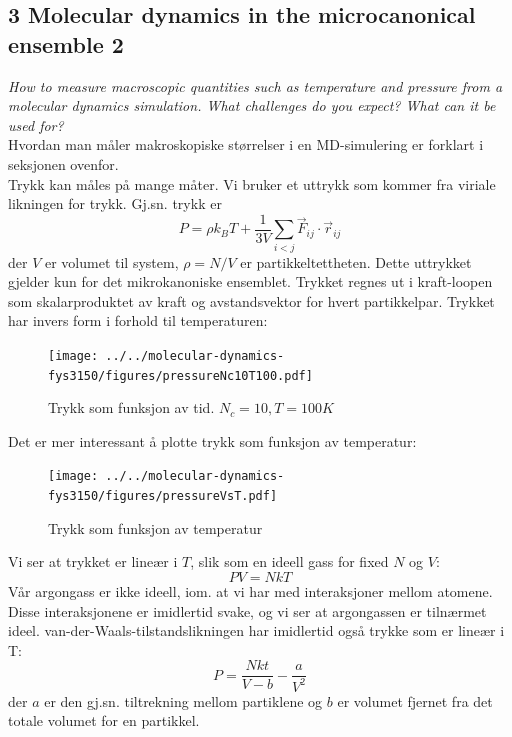 \documentclass[english, a4paper]{article}
\begin{document}
\subsection{3 Molecular dynamics in the microcanonical ensemble 2}
\textit{How to measure macroscopic quantities such as temperature and pressure from a 
molecular dynamics simulation. What challenges do you expect? What can it be used for?} \\

\noindent
Hvordan man måler makroskopiske størrelser i en MD-simulering er forklart i seksjonen ovenfor.\\

\noindent
Trykk kan måles på mange måter. Vi bruker et uttrykk som kommer fra viriale likningen for trykk. 
Gj.sn. trykk er
\begin{equation}
 P = \rho k_BT + \frac{1}{3V} \sum_{i<j} \vec{F}_{ij} \cdot \vec{r}_{ij}
\end{equation}
der $V$ er volumet til system, $\rho = N/V$ er partikkeltettheten. Dette uttrykket 
gjelder kun for det mikrokanoniske ensemblet. Trykket regnes ut i kraft-loopen som skalarproduktet
av kraft og avstandsvektor for hvert partikkelpar. 
Trykket har invers form i forhold til temperaturen:
\begin{figure}[H]
  \begin{center}
  \texttt{[image: ../../molecular-dynamics-fys3150/figures/pressureNc10T100.pdf]}
  \caption{Trykk som funksjon av tid. $N_c = 10, T = 100 K$}
  \label{fig:fig3}
  \end{center}
\end{figure}
Det er mer interessant å plotte trykk som funksjon av temperatur:
\begin{figure}[H]
  \begin{center}
  \texttt{[image: ../../molecular-dynamics-fys3150/figures/pressureVsT.pdf]}
  \caption{Trykk som funksjon av temperatur}
  \label{fig:fig4}
  \end{center}
\end{figure}
Vi ser at trykket er lineær i $T$, slik som en ideell gass for fixed $N$ og $V$:
\begin{equation}
 PV = NkT
\end{equation}
Vår argongass er ikke ideell, iom. at vi har med interaksjoner mellom atomene. Disse
interaksjonene er imidlertid svake, og vi ser at argongassen er tilnærmet ideel.
van-der-Waals-tilstandslikningen har imidlertid også trykke som er lineær i T:
\begin{equation}
 P = \frac{Nkt}{V-b} - \frac{a}{V^2}
\end{equation}
der $a$ er den gj.sn. tiltrekning mellom partiklene og $b$ er volumet fjernet fra det totale volumet for en partikkel.\\
\end{document}
